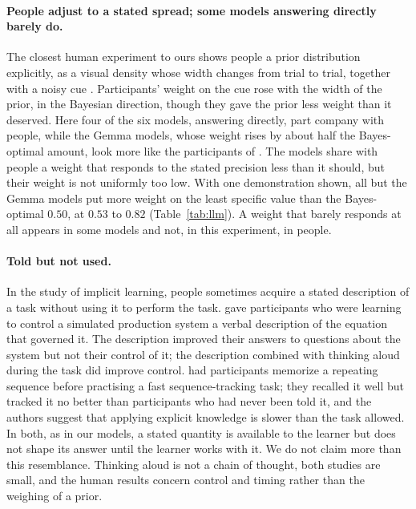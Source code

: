 \paragraph{People adjust to a stated spread; some models answering directly barely do.} The closest human experiment to ours shows people a prior distribution explicitly, as a visual density whose width changes from trial to trial, together with a noisy cue \citep{acerbi2014}. Participants' weight on the cue rose with the width of the prior, in the Bayesian direction, though they gave the prior less weight than it deserved. Here four of the six models, answering directly, part company with people, while the Gemma models, whose weight rises by about half the Bayes-optimal amount, look more like the participants of \citet{acerbi2014}. The models share with people a weight that responds to the stated precision less than it should, but their weight is not uniformly too low. With one demonstration shown, all but the Gemma models put more weight on the least specific value than the Bayes-optimal $0.50$, at $0.53$ to $0.82$ (Table~\ref{tab:llm}). A weight that barely responds at all appears in some models and not, in this experiment, in people.

\paragraph{Told but not used.} In the study of implicit learning, people sometimes acquire a stated description of a task without using it to perform the task. \citet{berry1984} gave participants who were learning to control a simulated production system a verbal description of the equation that governed it. The description improved their answers to questions about the system but not their control of it; the description combined with thinking aloud during the task did improve control. \citet{sanchez2013} had participants memorize a repeating sequence before practising a fast sequence-tracking task; they recalled it well but tracked it no better than participants who had never been told it, and the authors suggest that applying explicit knowledge is slower than the task allowed. In both, as in our models, a stated quantity is available to the learner but does not shape its answer until the learner works with it. We do not claim more than this resemblance. Thinking aloud is not a chain of thought, both studies are small, and the human results concern control and timing rather than the weighing of a prior.

